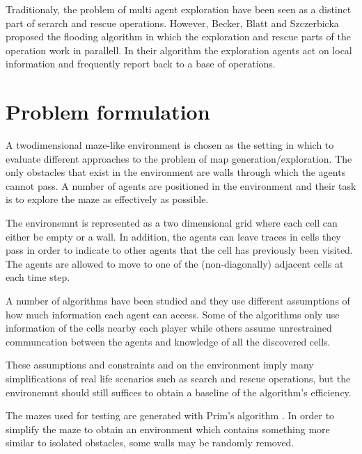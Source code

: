 \documentclass{article}
\begin{document}
Traditionaly, the problem of multi agent exploration have been seen as a
distinct part of serarch and rescue operations. However, Becker, Blatt and
Szczerbicka proposed the flooding algorithm \cite{becker2013multi} in which the
exploration and rescue parts of the operation work in parallell. In their
algorithm the exploration agents act on local information and frequently report
back to a base of operations.

\section{Problem formulation}
A twodimensional maze-like environment is chosen as the setting in which to
evaluate different approaches to the problem of map generation/exploration.
The only obstacles that exist in the environment are walls through which the
agents cannot pass. A number of agents are positioned in the environment and
their task is to explore the maze as effectively as possible.

The environemnt is represented as a two dimensional grid where each cell can
either be empty or a wall. In addition, the agents can leave traces in cells
they pass in order to indicate to other agents that the cell has previously
been visited. The agents are allowed to move to one of the (non-diagonally)
adjacent cells at each time step. 

A number of algorithms have been studied and they use different assumptions of
how much information each agent can access. Some of the algorithms only use
information of the cells nearby each player while others assume unrestrained
communcation between the agents and knowledge of all the discovered cells.

These assumptions and  constraints and on the environment imply many
simplifications of real life scenarios such as search and rescue operations,
but the environemnt should still suffices to obtain a baseline of the
algorithm's efficiency.

The mazes used for testing are generated with Prim's algorithm
\cite{prim1957shortest}. In order to simplify the maze to obtain an environment
which contains something more similar to isolated obstacles, some walls may be
randomly removed.
\end{document}
